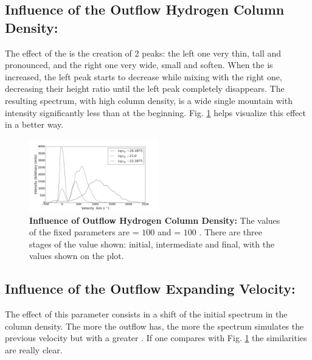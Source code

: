 \documentclass{latex/emulateapj}
\begin{document}
\subsection{Influence of the Outflow Hydrogen Column Density: \lognh }

The effect of the \lognh is the creation of 2 peaks: the left one very thin, tall and pronounced, and the right one very wide, small and soften. When the \lognh is increased, the left peak starts to decrease while mixing with the right one, decreasing their height ratio until the left peak completely disappears. The resulting spectrum, with high column density, is a wide single mountain with intensity significantly less than at the beginning. Fig. \ref{fig:influence_lognH} helps visualize this effect in a better way.\\

\begin{figure}[h!]
\begin{center}
  \includegraphics[width=0.5\textwidth]{./figures/inf_lognh_soft.png}
\end{center}
\caption{\textbf{Influence of Outflow Hydrogen Column Density:} The values of the fixed parameters are \vout = $100$ \kms and \vrot = $100$ \kms. There are three stages of the \lognh value shown: initial, intermediate and final, with the values shown on the plot.\\
\label{fig:influence_lognH}}
\end{figure}

\subsection{Influence of the Outflow Expanding Velocity: \vout }

The effect of this parameter consists in a shift of the initial spectrum in the column density. The more \vout the outflow has, the more the spectrum simulates the previous velocity but with a greater \lognh. If one compares with Fig. \ref{fig:influence_lognH} the similarities are really clear. \\
\end{document}
